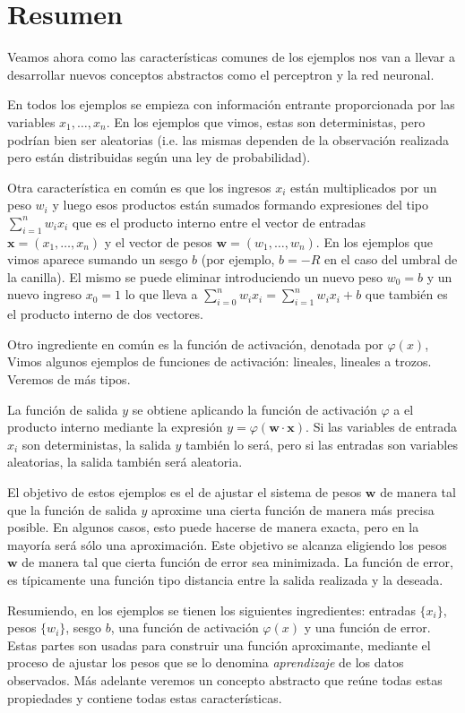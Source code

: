 \documentclass[12pt, a4paper]{amsbook}
\newcommand{\ww}{{\mathbf w}}
\newcommand{\xx}{{\mathbf x}}
\theoremstyle{remark}
\theoremstyle{definition}
\numberwithin{section}{chapter}
\numberwithin{subsection}{section}
\numberwithin{equation}{section}
\numberwithin{figure}{chapter}
\begin{document}
\section{Resumen}\label{sec.c1.4}

Veamos ahora como las características comunes de los ejemplos nos van a llevar a desarrollar nuevos conceptos abstractos como el perceptron y la red neuronal.

En todos los ejemplos se empieza con información entrante proporcionada por las variables $x_1,\dots,x_n$. En los ejemplos que vimos, estas son deterministas, pero podrían bien ser aleatorias (i.e. las mismas dependen de la observación realizada pero están distribuidas según una ley de probabilidad).

Otra característica en común es que los ingresos $x_i$ están multiplicados por un peso $w_i$ y luego esos productos están sumados formando expresiones del tipo $\sum_{i=1}^n w_i x_i$ que es el producto interno entre el vector de entradas $\xx=(x_1,\dots,x_n)$ y el vector de pesos $\ww = (w_1,\dots,w_n)$. En los ejemplos que vimos aparece sumando un sesgo $b$ (por ejemplo, $b=-R$ en el caso del umbral de la canilla). El mismo se puede eliminar introduciendo un nuevo peso $w_0=b$ y un nuevo ingreso $x_0=1$ lo que lleva a $\sum_{i=0}^n w_i x_i = \sum_{i=1}^n w_i x_i + b$ que también es el producto interno de dos vectores.

Otro ingrediente en común es la función de activación, denotada por $\varphi(x)$, Vimos algunos ejemplos de funciones de activación: lineales, lineales a trozos. Veremos de más tipos.

La función de salida $y$ se obtiene aplicando la función de activación $\varphi$ a el producto interno mediante la expresión $y=\varphi(\ww\cdot \xx)$. Si las variables de entrada $x_i$ son deterministas, la salida $y$ también lo será, pero si las entradas son variables aleatorias, la salida también será aleatoria.

El objetivo de estos ejemplos es el de ajustar el sistema de pesos $\ww$ de manera tal que la función de salida $y$ aproxime una cierta función de manera más precisa posible. En algunos casos, esto puede hacerse de manera exacta, pero en la mayoría será sólo una aproximación. Este objetivo se alcanza eligiendo los pesos $\ww$ de manera tal que cierta función de error sea minimizada. La función de error, es típicamente una función tipo distancia entre la salida realizada y la deseada. 

Resumiendo, en los ejemplos se tienen los siguientes ingredientes: entradas $\{x_i\}$, pesos $\{w_i\}$, sesgo $b$, una función de activación $\varphi(x)$ y una función de error. Estas partes son usadas para construir una función aproximante, mediante el proceso de ajustar los pesos que se lo denomina {\em aprendizaje} de los datos observados. Más adelante veremos un concepto abstracto que reúne todas estas propiedades y contiene todas estas características.
\end{document}

